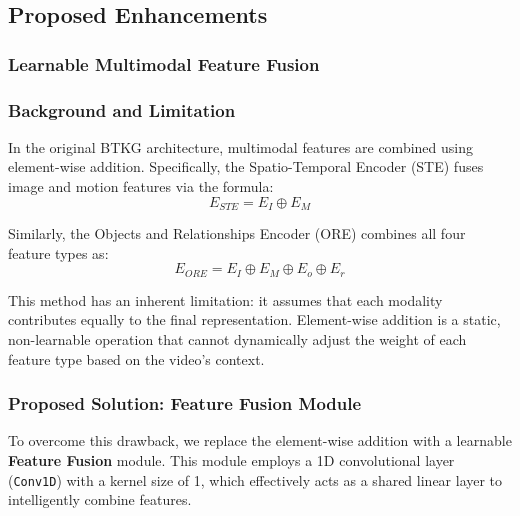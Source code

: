 \subsection{Proposed Enhancements}

\subsubsection{Learnable Multimodal Feature Fusion}

\subsubsection*{Background and Limitation}

In the original BTKG architecture, multimodal features are combined using element-wise addition. Specifically, the Spatio-Temporal Encoder (STE) fuses image and motion features via the formula:
$$E_{STE} = E_I \oplus E_M$$

Similarly, the Objects and Relationships Encoder (ORE) combines all four feature types as:
$$E_{ORE} = E_I \oplus E_M \oplus E_o \oplus E_r$$

This method has an inherent limitation: it assumes that each modality contributes equally to the final representation. Element-wise addition is a static, non-learnable operation that cannot dynamically adjust the weight of each feature type based on the video's context.

\subsubsection*{Proposed Solution: Feature Fusion Module}

To overcome this drawback, we replace the element-wise addition with a learnable \textbf{Feature Fusion} module. This module employs a 1D convolutional layer (\texttt{Conv1D}) with a kernel size of 1, which effectively acts as a shared linear layer to intelligently combine features.

